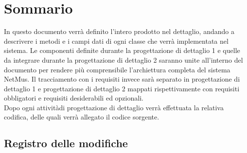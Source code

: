 \newcommand{\nomedoc}{Definizione Del Prodotto}
\newcommand{\versione}{0.16}
\newcommand{\versioneglossario}{3.0}
\newcommand{\versionenormeprogetto}{3.0}
\newcommand{\versionespecifica}{2.0}
\newcommand{\nomefile}{DefinizioneDelProdotto-\versione.pdf}
\newcommand{\datacreazione}{3 Febbraio 2011}
\newcommand{\datamodifica}{23 Febbraio 2011}
\newcommand{\stato}{formale}
\newcommand{\uso}{esterno}
\newcommand{\redazione}{---}
\newcommand{\verifica}{---}
\newcommand{\approvazione}{---}
\newcommand{\distribuzione}{
VT.G \\
& Prof. Vardanega Tullio\\
& Prof. Cardin Riccardo }


\usepackage{amsfonts}





\chapter*{Sommario}
\thispagestyle{fancy}
In questo documento verr\`a definito l'intero prodotto nel dettaglio, andando a
descrivere i metodi e i campi dati di ogni classe che verr\`a implementata nel
sistema. Le componenti definite durante la progettazione di dettaglio 1 e quelle
da integrare durante la progettazione di dettaglio 2 saranno unite all'interno
del documento per rendere pi\`u comprensibile l'archiettura completa del sistema
NetMus. Il tracciamento con i requisiti invece sar\`a separato in progettazione
di dettaglio 1 e progettazione di dettaglio 2 mappati rispettivamente con
requisiti obbligatori e requisiti desiderabili ed opzionali.\\
Dopo ogni attivit\`adi progettazione di dettaglio verr\`a effettuata la relativa
codifica, delle quali verr\`a allegato il codice sorgente.

\newpage
\section*{Registro delle modifiche}

